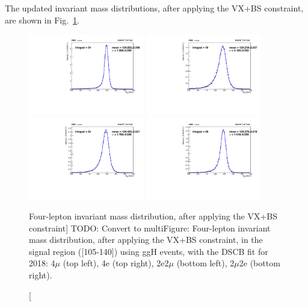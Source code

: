 The updated invariant mass distributions, after applying the VX+BS constraint, are shown in Fig.~\ref{fig:1D_VXBS_mass_2018_ggH}.
\begin{figure}[!htbp]
    \begin{center}
        \includegraphics[width=0.45\textwidth]{figures/higgsmassmeas/ggH_MassDistribution/1D_VXBS_mass_2018_ggH_4mu.pdf}
        \includegraphics[width=0.45\textwidth]{figures/higgsmassmeas/ggH_MassDistribution/1D_VXBS_mass_2018_ggH_4e.pdf}
        \includegraphics[width=0.45\textwidth]{figures/higgsmassmeas/ggH_MassDistribution/1D_VXBS_mass_2018_ggH_2e2mu.pdf}
        \includegraphics[width=0.45\textwidth]{figures/higgsmassmeas/ggH_MassDistribution/1D_VXBS_mass_2018_ggH_2mu2e.pdf}
        \caption
            [Four-lepton invariant mass distribution, after applying the VX+BS constraint]
            {TODO: Convert to multiFigure: Four-lepton invariant mass distribution, after applying the VX+BS constraint, in 
            the signal region ([105-140]\GeV) using ggH events, with the DSCB fit for 2018: 4$\mu$ (top left),
            4e (top right), 2e2$\mu$ (bottom left), 2$\mu$2e (bottom right).}
    \label{fig:1D_VXBS_mass_2018_ggH}
    \end{center}
    \end{figure}
